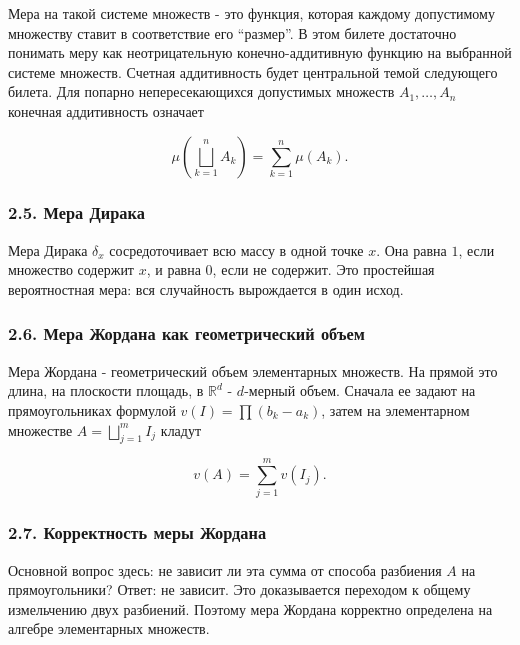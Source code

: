 \documentclass[
  11pt,
  a4paper,
]{article}
\begin{document}
Мера на такой системе множеств - это функция, которая каждому
допустимому множеству ставит в соответствие его ``размер''. В этом
билете достаточно понимать меру как неотрицательную конечно-аддитивную
функцию на выбранной системе множеств. Счетная аддитивность будет
центральной темой следующего билета. Для попарно непересекающихся
допустимых множеств \(A_1,\ldots,A_n\) конечная аддитивность означает

\[
\mu\left(\bigsqcup_{k=1}^n A_k\right)=\sum_{k=1}^n\mu(A_k).
\]

\subsubsection{2.5. Мера
Дирака}\label{ux43cux435ux440ux430-ux434ux438ux440ux430ux43aux430}

Мера Дирака \(\delta_x\) сосредоточивает всю массу в одной точке \(x\).
Она равна \(1\), если множество содержит \(x\), и равна \(0\), если не
содержит. Это простейшая вероятностная мера: вся случайность вырождается
в один исход.

\subsubsection{2.6. Мера Жордана как геометрический
объем}\label{ux43cux435ux440ux430-ux436ux43eux440ux434ux430ux43dux430-ux43aux430ux43a-ux433ux435ux43eux43cux435ux442ux440ux438ux447ux435ux441ux43aux438ux439-ux43eux431ux44aux435ux43c}

Мера Жордана - геометрический объем элементарных множеств. На прямой это
длина, на плоскости площадь, в \(\mathbb R^d\) - \(d\)-мерный объем.
Сначала ее задают на прямоугольниках формулой \(v(I)=\prod(b_k-a_k)\),
затем на элементарном множестве \(A=\bigsqcup_{j=1}^m I_j\) кладут

\[
v(A)=\sum_{j=1}^m v(I_j).
\]

\subsubsection{2.7. Корректность меры
Жордана}\label{ux43aux43eux440ux440ux435ux43aux442ux43dux43eux441ux442ux44c-ux43cux435ux440ux44b-ux436ux43eux440ux434ux430ux43dux430}

Основной вопрос здесь: не зависит ли эта сумма от способа разбиения
\(A\) на прямоугольники? Ответ: не зависит. Это доказывается переходом к
общему измельчению двух разбиений. Поэтому мера Жордана корректно
определена на алгебре элементарных множеств.
\end{document}
